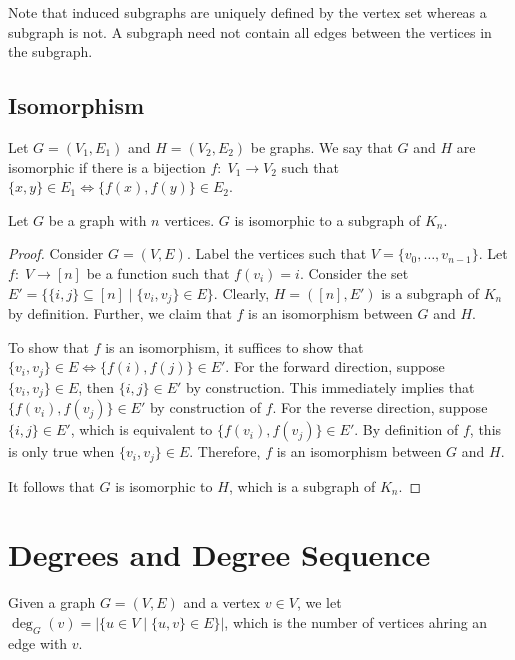 Note that induced subgraphs are uniquely defined by the vertex set whereas a subgraph is not. A subgraph need not contain all edges between the vertices in the subgraph.

\subsection{Isomorphism}

\begin{definition}
    Let $G = (V_1,E_1)$ and $H = (V_2,E_2)$ be graphs. We say that $G$ and $H$ are isomorphic if there is a bijection $f:\; V_1 \to V_2$ such that $\{x,y\} \in E_1 \iff \{f(x),f(y)\} \in E_2$.
\end{definition}

\begin{theorem}
    Let $G$ be a graph with $n$ vertices. $G$ is isomorphic to a subgraph of $K_n$.
\end{theorem}

\begin{proof}
    Consider $G = (V,E)$. Label the vertices such that $V = \{v_0,\ldots,v_{n-1}\}$. Let $f:\; V \to [n]$ be a function such that $f(v_i) = i$. Consider the set $E' = \{\{i,j\} \subseteq [n] \mid \{v_i,v_j\} \in E\}$. Clearly, $H = ([n], E')$ is a subgraph of $K_n$ by definition. Further, we claim that $f$ is an isomorphism between $G$ and $H$.
    
    To show that $f$ is an isomorphism, it suffices to show that $\{v_i,v_j\} \in E \iff \{f(i),f(j)\} \in E'$. For the forward direction, suppose $\{v_i,v_j\} \in E$, then $\{i,j\} \in E'$ by construction. This immediately implies that $\{f(v_i),f(v_j)\} \in E'$ by construction of $f$. For the reverse direction, suppose $\{i,j\} \in E'$, which is equivalent to $\{f(v_i),f(v_j)\} \in E'$. By definition of $f$, this is only true when $\{v_i,v_j\} \in E$. Therefore, $f$ is an isomorphism between $G$ and $H$.
    
    It follows that $G$ is isomorphic to $H$, which is a subgraph of $K_n$.
\end{proof}

\section{Degrees and Degree Sequence}

\begin{definition}[Degree]
    Given a graph $G = (V,E)$ and a vertex $v \in V$, we let $\deg_G(v) = |\{u \in V \mid \{u,v\} \in E\}|$, which is the number of vertices ahring an edge with $v$.
\end{definition}

